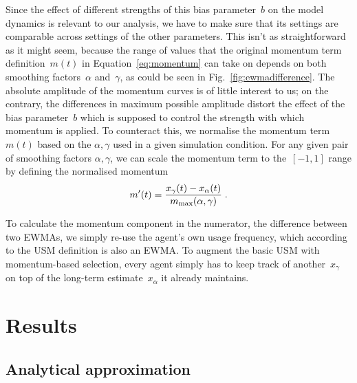 \documentclass[10pt]{article}
\begin{document}
Since the effect of different strengths of this bias parameter~$b$ on the model dynamics is relevant to our analysis, we have to make sure that its settings are comparable across settings of the other parameters. This isn't as straightforward as it might seem, because the range of values that the original momentum term definition~$m(t)$ in Equation~\ref{eq:momentum} can take on depends on both smoothing factors~$\alpha$ and~$\gamma$, as could be seen in Fig.~\ref{fig:ewmadifference}. The absolute amplitude of the momentum curves is of little interest to us; on the contrary, the differences in maximum possible amplitude distort the effect of the bias parameter~$b$ which is supposed to control the strength with which momentum is applied. To counteract this, we normalise the momentum term~$m(t)$ based on the $\alpha, \gamma$ used in a given simulation condition. For any given pair of smoothing factors $\alpha, \gamma$, we can scale the momentum term to the~$[-1,1]$ range by defining the normalised momentum
\begin{equation}
m'(t)=\frac{x_\gamma(t) - x_\alpha(t)}{m_{\rm max}(\alpha, \gamma)}\;.
\label{eq:normalisedmomentum}
\end{equation}

To calculate the momentum component in the numerator, the difference between two EWMAs, we simply re-use the agent's own usage frequency, which according to the USM definition is also an EWMA. To augment the basic USM with momentum-based selection, every agent simply has to keep track of another~$x_\gamma$ on top of the long-term estimate~$x_\alpha$ it already maintains.


\section{Results}

\subsection{Analytical approximation}
\end{document}
